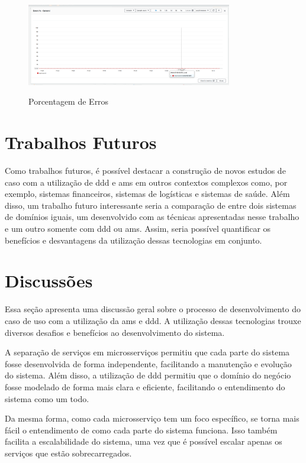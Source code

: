 \begin{figure}[H]
    \centering
    \caption{Porcentagem de Erros}
    \includegraphics[width=0.8\textwidth]{media/errors.png}
    \label{fig:error-rate}
\end{figure}

\section{Trabalhos Futuros}
Como trabalhos futuros, é possível destacar a construção de novos estudos de caso com a utilização de \acrshort{ddd} e \acrshort{ams} em outros contextos complexos como, por exemplo, sistemas financeiros, sistemas de logísticas e sistemas de saúde. Além disso, um trabalho futuro interessante seria a comparação de entre dois sistemas de domínios iguais, um desenvolvido com as técnicas apresentadas nesse trabalho e um outro somente com \acrshort{ddd} ou \acrshort{ams}. Assim, seria possível quantificar os benefícios e desvantagens da utilização dessas tecnologias em conjunto.

\section{Discussões}
Essa seção apresenta uma discussão geral sobre o processo de desenvolvimento do caso de uso com a utilização da \acrfull{ams} e \acrfull{ddd}. A utilização dessas tecnologias trouxe diversos desafios e benefícios ao desenvolvimento do sistema.

A separação de serviços em microsserviços permitiu que cada parte do sistema fosse desenvolvida de forma independente, facilitando a manutenção e evolução do sistema. Além disso, a utilização de \acrfull{ddd} permitiu que o domínio do negócio fosse modelado de forma mais clara e eficiente, facilitando o entendimento do sistema como um todo.

Da mesma forma, como cada microsserviço tem um foco específico, se torna mais fácil o entendimento de como cada parte do sistema funciona. Isso também facilita a escalabilidade do sistema, uma vez que é possível escalar apenas os serviços que estão sobrecarregados.

